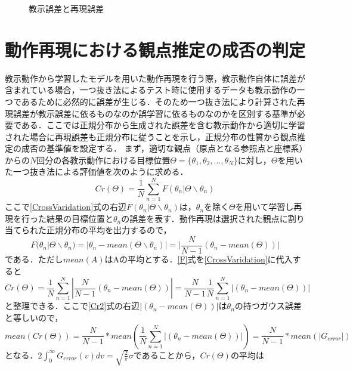 \begin{figure}
\begin{center}
			\caption{教示誤差と再現誤差}
			\label{figure:errors}
		\end{center}
	\end{figure}


\chapter{動作再現における観点推定の成否の判定}\label{appendix2}

教示動作から学習したモデルを用いた動作再現を行う際，教示動作自体に誤差が含まれている場合，一つ抜き法によるテスト時に使用するデータも教示動作の一つであるために必然的に誤差が生じる．そのため一つ抜き法により計算された再現誤差が教示誤差に依るものなのか誤学習に依るものなのかを区別する基準が必要である．ここでは正規分布から生成された誤差を含む教示動作から適切に学習された場合に再現誤差も正規分布に従うことを示し，正規分布の性質から観点推定の成否の基準値を設定する．
まず，適切な観点（原点となる参照点と座標系）からの$N$回分の各教示動作における目標位置$Θ=\{θ_{1} , θ_{2} , \ldots , θ_{N}\}$に対し，$Θ$を用いた一つ抜き法による評価値を次のように求める．
	\begin{equation}
		\label{CrossVaridation}
		Cr(Θ) = \frac{1}{N} \sum_{n=1}^{N} F(θ_{n} | Θ \backslash θ_{n})
	\end{equation}
ここで\ref{CrossVaridation}式の右辺$F(θ_{n} | Θ \backslash θ_{n})$は，$θ_{n}$を除く$Θ$を用いて学習し再現を行った結果の目標位置と$θ_{n}$の誤差を表す．動作再現は選択された観点に割り当てられた正規分布の平均を出力するので，
	\begin{equation}
		\label{F}
		F(θ_{n} | Θ \backslash θ_{n}) = |θ_{n} - mean(Θ \backslash θ_{n})| = |\frac{N}{N-1}(θ_{n} - mean(Θ))|
	\end{equation}
である．ただし$mean(A)$はAの平均とする．\ref{F}式を\ref{CrossVaridation}に代入すると
	\begin{equation}
		\label{Cr2}
		Cr(Θ) = \frac{1}{N} \sum_{n=1}^{N}  |\frac{N}{N-1}(θ_{n} - mean(Θ))|
		 = \frac{N}{N-1}\frac{1}{N}  \sum_{n=1}^{N}  |(θ_{n} - mean(Θ))| 
	\end{equation}
と整理できる．ここで\ref{Cr2}式の右辺$|(θ_{n} - mean(Θ))|$は$θ_{n}$の持つガウス誤差と等しいので，
	\begin{equation}
		\label{Cr3}
		mean(Cr(Θ)) = \frac{N}{N-1} * mean(\frac{1}{N}  \sum_{n=1}^{N}  |(θ_{n} - mean(Θ))| )
		 = \frac{N}{N-1} * mean(|G_{error}|)
	\end{equation}
となる．$2\int_{0}^{\infty}G_{error}(v)dv = \sqrt{\frac{2}{\pi}}σ$であることから，$Cr(Θ)$の平均は
